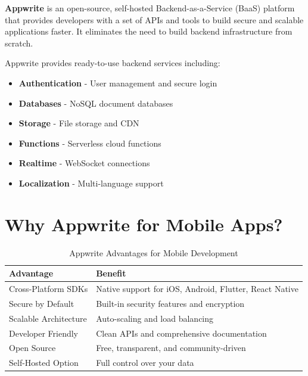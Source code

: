 \documentclass[11pt,a4paper,oneside]{book}
\begin{document}
\begin{definitionbox}
\textbf{Appwrite} is an open-source, self-hosted Backend-as-a-Service (BaaS) platform that provides developers with a set of APIs and tools to build secure and scalable applications faster. It eliminates the need to build backend infrastructure from scratch.
\end{definitionbox}

Appwrite provides ready-to-use backend services including:

\begin{itemize}[leftmargin=2cm]
    \item[\faLock] \textbf{Authentication} - User management and secure login
    \item[\faDatabase] \textbf{Databases} - NoSQL document databases
    \item[\faCloud] \textbf{Storage} - File storage and CDN
    \item[\faCode] \textbf{Functions} - Serverless cloud functions
    \item[\faBolt] \textbf{Realtime} - WebSocket connections
    \item[\faGlobe] \textbf{Localization} - Multi-language support
\end{itemize}

\section{Why Appwrite for Mobile Apps?}

\begin{table}[h]
\centering
\begin{tabularx}{\textwidth}{l X}
\toprule
\textbf{Advantage} & \textbf{Benefit} \\
\midrule
Cross-Platform SDKs & Native support for iOS, Android, Flutter, React Native \\
Secure by Default & Built-in security features and encryption \\
Scalable Architecture & Auto-scaling and load balancing \\
Developer Friendly & Clean APIs and comprehensive documentation \\
Open Source & Free, transparent, and community-driven \\
Self-Hosted Option & Full control over your data \\
\bottomrule
\end{tabularx}
\caption{Appwrite Advantages for Mobile Development}
\end{table}
\end{document}
